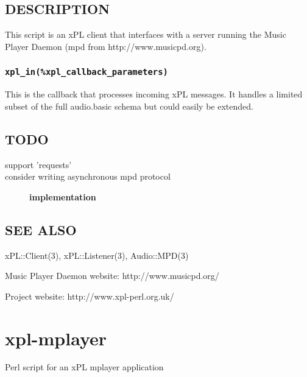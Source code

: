 \documentclass[12pt,a4paper]{article}
\begin{document}
\subsection*{DESCRIPTION\label{xpl-mpd_DESCRIPTION}}


This script is an xPL client that interfaces with a server running
the Music Player Daemon (mpd from http://www.musicpd.org).

\subsubsection*{\texttt{xpl\_in(\%xpl\_callback\_parameters)}\label{xpl-mpd_xpl_in_xpl_callback_parameters_}}


This is the callback that processes incoming xPL messages.  It handles
a limited subset of the full audio.basic schema but could easily be
extended.

\subsection*{TODO\label{xpl-mpd_TODO}}
\begin{description}

\item[{support 'requests'}] \mbox{}
\item[{consider writing asynchronous mpd protocol}] \textbf{implementation}\end{description}
\subsection*{SEE ALSO\label{xpl-mpd_SEE_ALSO}}


xPL::Client(3), xPL::Listener(3), Audio::MPD(3)



Music Player Daemon website: http://www.musicpd.org/



Project website: http://www.xpl-perl.org.uk/

\newpage
\section{xpl-mplayer\label{xpl-mplayer}}


Perl script for an xPL mplayer application
\end{document}
